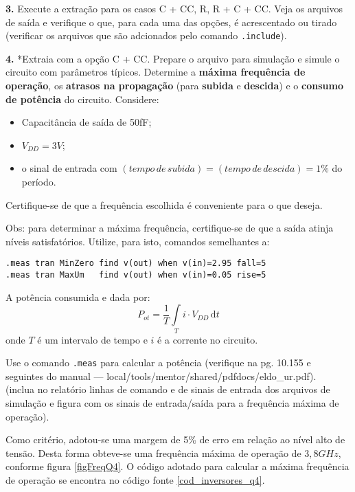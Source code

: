 \documentclass[10pt, a4paper, titlepage]{article}
\begin{document}
\textbf{3.} Execute a extração para os casos C + CC, R, R + C + CC. Veja os arquivos de saída e verifique o que, para cada uma das opções, é acrescentado ou tirado (verificar os arquivos que são adcionados pelo comando \verb|.include|).

\textbf{4.} *Extraia com a opção C + CC. Prepare o arquivo para simulação e simule o circuito com parâmetros típicos. Determine a \textbf{máxima frequência de operação}, os \textbf{atrasos na propagação} (para \textbf{subida} e \textbf{descida}) e o \textbf{consumo de potência} do circuito.
Considere:
\begin{itemize}
    \item Capacitância de saída de 50fF;
    \item $V_{DD} = 3V$;
    \item o sinal de entrada com $(tempo\, de\, subida) = (tempo\, de\, descida) = 1\%$ do período.
\end{itemize}

Certifique-se de que a frequência escolhida é conveniente para o que deseja.

Obs: para determinar a máxima frequência, certifique-se de que a saída atinja níveis satisfatórios. Utilize, para isto, comandos semelhantes a:\\
        \begin{verbatim}
.meas tran MinZero find v(out) when v(in)=2.95 fall=5
.meas tran MaxUm   find v(out) when v(in)=0.05 rise=5
        \end{verbatim}

A potência consumida e dada por:
\begin{equation}
P_{ot} = \frac{1}{T} \int\limits_T i \cdot V_{DD} \, \mathrm{d}t \label{equPotenciaConsumida}
\end{equation}
onde $T$ é um intervalo de tempo e $i$ é a corrente no circuito.

Use o comando \verb|.meas| para calcular a potência (verifique na pg. 10.155 e seguintes do manual --- local/tools/mentor/shared/pdfdocs/eldo\_ur.pdf).\\
(inclua no relatório linhas de comando e de sinais de entrada dos arquivos de simulação e figura com os sinais de entrada\slash saída para a frequência máxima de operação).

Como critério, adotou-se uma margem de 5\% de erro em relação ao nível alto de tensão. Desta forma obteve-se uma frequência máxima de operação de $3,8 GHz$, conforme figura \ref{figFreqQ4}. O código adotado para calcular a máxima frequência de operação se encontra no código fonte \ref{cod_inversores_q4}.
\end{document}
